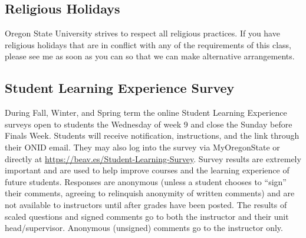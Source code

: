 \documentclass[10pt]{article}
\begin{document}
\subsection*{Religious Holidays}
Oregon State University strives to respect all religious practices.
If you have religious holidays that are in conflict with any of the requirements of this class, please see me as soon as you can so that we can make alternative arrangements.

\subsection*{Student Learning Experience Survey}
During Fall, Winter, and Spring term the online Student Learning Experience surveys open to students the Wednesday of week 9 and close the Sunday before Finals Week. Students will receive notification, instructions, and the link through their ONID email. They may also log into the survey via MyOregonState or directly at \url{https://beav.es/Student-Learning-Survey}. Survey results are extremely important and are used to help improve courses and the learning experience of future students. Responses are anonymous (unless a student chooses to ``sign'' their comments, agreeing to relinquish anonymity of written comments) and are not available to instructors until after grades have been posted. The results of scaled questions and signed comments go to both the instructor and their unit head/supervisor. Anonymous (unsigned) comments go to the instructor only.
\end{document}

